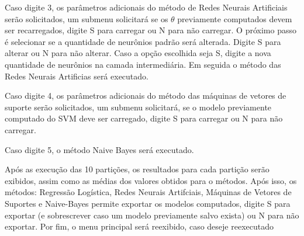 Caso digite 3, os parâmetros adicionais do método de Redes Neurais Artificiais serão solicitados, um submenu solicitará se os \(\theta\) previamente computados devem ser recarregados, digite S para carregar ou N para não carregar. O próximo passo é selecionar se a quantidade de neurônios padrão será alterada. Digite S para alterar ou N para não alterar. Caso a opção escolhida seja S, digite a nova quantidade de neurônios na camada intermediária.
Em seguida o método das Redes Neurais Artificias será executado.

Caso digite 4, os parâmetros adicionais do método das máquinas de vetores de suporte serão solicitados, um submenu solicitará, se o modelo previamente computado do SVM deve ser carregado, digite S para carregar ou N para não carregar.

Caso digite 5, o método Naive Bayes será executado.

Após as execução das 10 partições, os resultados para cada partição serão exibidos, assim como as médias dos valores obtidos para o métodos. Após isso, os métodos: Regressão Logística, Redes Neurais Artifciais, Máquinas de Vetores de Suportes e Naive-Bayes permite exportar os modelos computados, digite S para exportar (e sobrescrever caso um modelo previamente salvo exista) ou N para não exportar. Por fim, o menu principal será reexibido, caso deseje reexecutado


